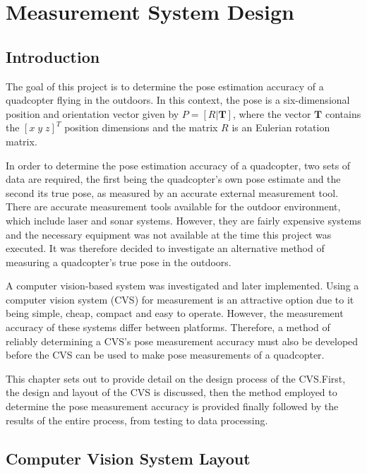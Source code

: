 \chapter{Measurement System Design}
\label{chap3}

\section{Introduction}

The goal of this project is to determine the pose estimation accuracy of a quadcopter flying in the outdoors. In this context, the pose is a six-dimensional position and orientation vector given by $P = [R | \bm{T}]$, where the vector $\bm{T}$ contains the $[x\;y\;z]^T$ position dimensions and the matrix $R$ is an Eulerian rotation matrix. 

In order to determine the pose estimation accuracy of a quadcopter, two sets of data are required, the first being the quadcopter's own pose estimate and the second its true pose, as measured by an accurate external measurement tool. There are accurate measurement tools available for the outdoor environment, which include laser and sonar systems. However, they are fairly expensive systems and the necessary equipment was not available at the time this project was executed. It was therefore decided to investigate an alternative method of measuring a quadcopter's true pose in the outdoors.

A computer vision-based system was investigated and later implemented. Using a computer vision system (CVS) for measurement is an attractive option due to it being simple, cheap, compact and easy to operate. However, the measurement accuracy of these systems differ between platforms. Therefore, a method of reliably determining a CVS's pose measurement accuracy must also be developed before the CVS can be used to make pose measurements of a quadcopter. 

This chapter sets out to provide detail on the design process of the CVS.\@ First, the design and layout of the CVS is discussed, then the method employed to determine the pose measurement accuracy is provided finally followed by the results of the entire process, from testing to data processing.

\section{Computer Vision System Layout}
\label{sec:chap3-cvs-layout}

